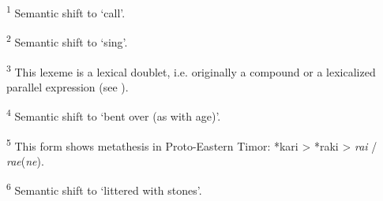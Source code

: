\raggedright
\textsuperscript{1} Semantic shift to `call'. 
 
 \textsuperscript{2} Semantic shift to `sing'.  

 \textsuperscript{3} This lexeme is a lexical doublet, i.e. originally a compound or a lexicalized parallel expression (see \citealt[224]{SchapperEtAl2012}).  

\textsuperscript{4} Semantic shift to `bent over (as with age)'. 
 
 \textsuperscript{5} This form shows metathesis in Proto-Eastern Timor: *kari {\textgreater} *raki {\textgreater} \textit{ra{\textglotstop}i} / \textit{ra{\textglotstop}e}(\textit{ne}).  

 \textsuperscript{6} Semantic shift to `littered with stones'.

